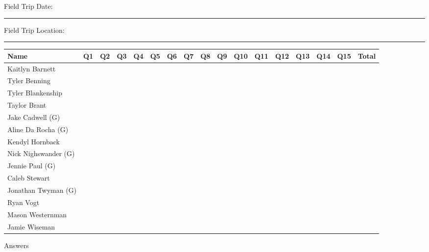 \documentclass[11pt]{article}
\newcommand{\VSpace}{\vspace{\baselineskip}}
\begin{document}
\begin{landscape}

\noindent Field Trip Date: \rule{2in}{0.4pt}\hfill Field Trip Location: \rule{2.9in}{0.4pt} \hfill \VSpace

\noindent\begin{tabular}{@{}b{1.5in}|c|c|c|c|c|c|c|c|c|c|c|c|c|c|c|m{0.5in}|@{}}
\toprule
Name	&	Q1 & Q2 & Q3 & Q4 & Q5 & Q6 & Q7 & Q8 & Q9 & Q10 & Q11 & Q12 & Q13 & Q14 & Q15 & Total \\
\hline
Kaitlyn Barnett &	& & & & & & & & & & & & & & & \\[1ex]
\hline
Tyler Benning &	& & & & & & & & & & & & & & & \\[1ex]
\hline
Tyler Blankenship &	& & & & & & & & & & & & & & & \\[1ex]
\hline
Taylor Brant &	& & & & & & & & & & & & & & & \\[1ex]
\hline
Jake Cadwell (G) &	& & & & & & & & & & & & & & & \\[1ex]
\hline
Aline Da Rocha (G) &	& & & & & & & & & & & & & & & \\[1ex]
\hline
Kendyl Hornback &	& & & & & & & & & & & & & & & \\[1ex]
\hline
Nick Nighswander (G) &	& & & & & & & & & & & & & & & \\[1ex]
\hline
Jennie Paul (G) &	& & & & & & & & & & & & & & & \\[1ex]
\hline
Caleb Stewart &	& & & & & & & & & & & & & & & \\[1ex]
\hline
Jonathan Twyman (G) &	& & & & & & & & & & & & & & & \\[1ex]
\hline
Ryan Vogt &	& & & & & & & & & & & & & & & \\[1ex]
\hline
Mason Westernman &	& & & & & & & & & & & & & & & \\[1ex]
\hline
Jamie Wiseman  &	& & & & & & & & & & & & & & & \\[1ex]
\bottomrule
\end{tabular}

\VSpace

\noindent Answers 


\end{landscape}
\end{document}
